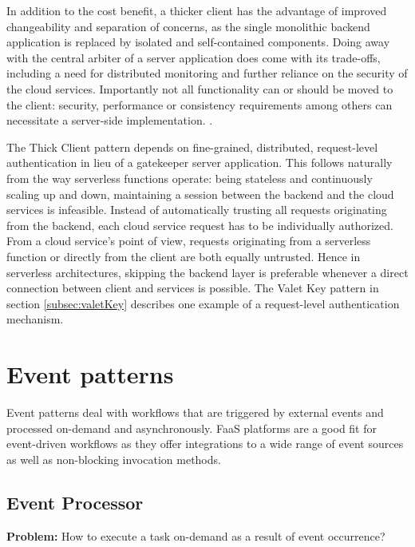 In addition to the cost benefit, a thicker client has the advantage of improved changeability and separation of concerns, as the single monolithic backend application is replaced by isolated and self-contained components. Doing away with the central arbiter of a server application does come with its trade-offs, including a need for distributed monitoring and further reliance on the security of the cloud services. Importantly not all functionality can or should be moved to the client: security, performance or consistency requirements among others can necessitate a server-side implementation. \parencite{robert2016serverlessarchitectures}.

The Thick Client pattern depends on fine-grained, distributed, request-level authentication in lieu of a gatekeeper server application. This follows naturally from the way serverless functions operate: being stateless and continuously scaling up and down, maintaining a session between the backend and the cloud services is infeasible. Instead of automatically trusting all requests originating from the backend, each cloud service request has to be individually authorized. From a cloud service's point of view, requests originating from a serverless function or directly from the client are both equally untrusted. Hence in serverless architectures, skipping the backend layer is preferable whenever a direct connection between client and services is possible. The Valet Key pattern in section \ref{subsec:valetKey} describes one example of a request-level authentication mechanism. \parencite{adzic2017serverless}

\section{Event patterns} \label{sec:eventPatterns}

Event patterns deal with workflows that are triggered by external events and processed on-demand and asynchronously. FaaS platforms are a good fit for event-driven workflows as they offer integrations to a wide range of event sources as well as non-blocking invocation methods.

\subsection{Event Processor} \label{subsec:Eventprocessing}

\textbf{Problem:} How to execute a task on-demand as a result of event occurrence?

